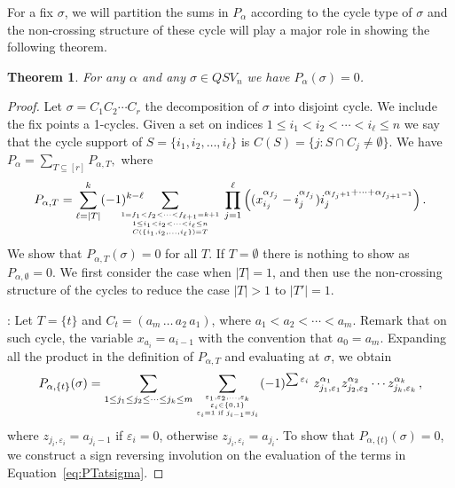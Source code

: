 \documentclass[12pt]{amsart}
\newtheorem{thm}[equation]{Theorem}
\theoremstyle{definition}
\theoremstyle{remark}
\numberwithin{equation}{section}
\renewcommand{\epsilon}{\varepsilon}
\begin{document}
For a fix $\sigma$, we will partition the sums in $P_\alpha$ according to the cycle type of $\sigma$ and the non-crossing structure
of these cycle will play a major role in showing the following theorem.

\begin{thm}\label{thm:vanishing}
 For any $\alpha$ and any $\sigma\in QSV_n$ we  have $P_\alpha(\sigma)=0$.
\end{thm}

\begin{proof}
 Let $\sigma=C_1C_2\cdots C_r$  the decomposition of $\sigma$ into disjoint cycle. We include the fix points a 1-cycles.
 Given a set on indices $1\le i_1<i_2<\cdots < i_\ell\le n$ we say that the cycle support of $S=\{ i_1,i_2,\ldots , i_\ell\}$
 is $C(S)=\{j : S\cap C_j \not= \emptyset \}$. We have
 	$\displaystyle P_\alpha=\sum_{T\subseteq [r]} P_{\alpha,T},$
where 
\begin{equation}\label{eq:PT}
P_{\alpha,T}=
	\sum_{\ell=|T|}^k (-1)^{k-\ell} \hskip-.8cm \sum_{{1=f_1<f_2<\cdots <f_{\ell+1}=k+1  \atop 1\le i_1<i_2<\cdots < i_\ell\le n}\atop C(\{ i_1,i_2,\ldots , i_\ell\})=T} \prod_{j=1}^\ell 
	      \Big( (x_{i_j}^{\alpha_{f_j}}- i_j^{\alpha_{f_j }})  i_j^{\alpha_{f_j +1}+\cdots+\alpha_{f_{j +1}-1}} \Big)\,.
\end{equation}
We show that $P_{\alpha,T}(\sigma)=0$ for all $T$. If $T=\emptyset$ there is nothing to show as $P_{\alpha,\emptyset}=0$. 
We first consider the case when $|T|=1$, and then use the non-crossing structure of the cycles to reduce the case $|T|>1$
to $|T'|=1$.

\medskip
{}: Let $T=\{t\}$ and $C_t=(a_m\,\ldots\,a_2\,a_1)$, where $a_1<a_2<\cdots<a_m$. Remark that on such cycle, the variable $x_{a_i}=a_{i-1}$ with the convention that $a_0=a_m$.
Expanding all the product in the definition of $P_{\alpha,T}$ and evaluating at $\sigma$, we obtain
\begin{equation}\label{eq:PTatsigma}
	P_{\alpha,\{t\}}(\sigma)=
	\sum_{{1\le j_1\le j_2\le\cdots\le j_k\le m}} \sum_{{\epsilon_1,\epsilon_2,\ldots,\epsilon_k \atop \epsilon_i\in \{0,1\}}\atop \epsilon_i=1 \text{ if } j_{i-1}=j_i} (-1)^{\sum \epsilon_i}\ 
	   z_{j_1,\epsilon_1}^{\alpha_1}z_{j_2,\epsilon_2}^{\alpha_2} \cdots z_{j_k,\epsilon_k}^{\alpha_k}\,,
\end{equation}
where $z_{j_i,\epsilon_i}=a_{j_i-1}$ if $\epsilon_i=0$, otherwise $z_{j_i,\epsilon_i}=a_{j_i}$. To show that $P_{\alpha,\{t\}}(\sigma)=0$, we construct a sign reversing involution 
on the evaluation of the terms in Equation~\eqref{eq:PTatsigma}.


\end{proof}
\end{document}
